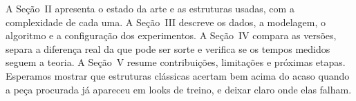 A Seção~II apresenta o estado da arte e as estruturas usadas, com a complexidade de cada uma. A Seção~III descreve os dados, a modelagem, o algoritmo e a configuração dos experimentos. A Seção~IV compara as versões, separa a diferença real da que pode ser sorte e verifica se os tempos medidos seguem a teoria. A Seção~V resume contribuições, limitações e próximas etapas. Esperamos mostrar que estruturas clássicas acertam bem acima do acaso quando a peça procurada já apareceu em looks de treino, e deixar claro onde elas falham.
